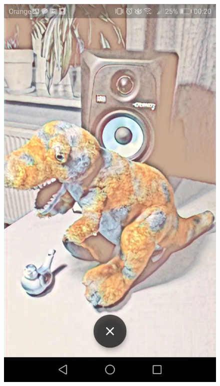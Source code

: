 \documentclass[../Main.tex]{subfiles}
\begin{document}
\begin{figure}[H]
        \includegraphics[width=\linewidth]{Images/dino4.jpg}
    \endminipage\hfill

\end{figure}
\end{document}
